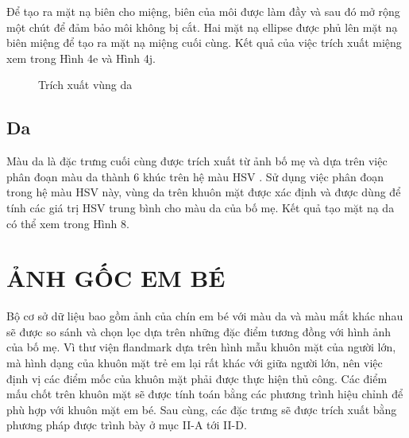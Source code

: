 \documentclass[journal]{IEEEtran}
\begin{document}
Để tạo ra mặt nạ biên cho miệng, biên của môi được làm đầy và sau đó mở rộng một chút để đảm bảo môi không bị cắt. Hai mặt nạ ellipse được phủ lên mặt nạ biên miệng để tạo ra mặt nạ miệng cuối cùng. Kết quả của việc trích xuất miệng xem trong Hình 4e và Hình 4j.


\begin{figure}[!t]
\centering
{}
\caption{Trích xuất vùng da}
\label{refhinh8}
\end{figure}

\subsection{Da}
Màu da là đặc trưng cuối cùng được trích xuất từ ảnh bố mẹ và dựa trên việc phân đoạn màu da thành 6 khúc trên hệ màu HSV \cite{ref:r9}. Sử dụng việc phân đoạn trong hệ màu HSV này, vùng da trên khuôn mặt được xác định và được dùng để tính các giá trị HSV trung bình cho màu da của bố mẹ. Kết quả tạo mặt nạ da có thể xem trong Hình 8.



\section{ẢNH GỐC EM BÉ}
Bộ cơ sở dữ liệu bao gồm ảnh của chín em bé với màu da và màu mắt khác nhau sẽ được so sánh và chọn lọc dựa trên những đặc điểm tương đồng với hình ảnh của bố mẹ. Vì thư viện flandmark dựa trên hình mẫu khuôn mặt của người lớn, mà hình dạng của khuôn mặt trẻ em lại rất khác với giữa người lớn, nên việc định vị các điểm mốc của khuôn mặt phải được thực hiện thủ công. Các điểm mấu chốt trên khuôn mặt sẽ được tính toán bằng các phương trình hiệu chỉnh để phù hợp với khuôn mặt em bé. Sau cùng, các đặc trưng sẽ được trích xuất bằng phương pháp được trình bày ở mục II-A tới II-D. 
\end{document}
